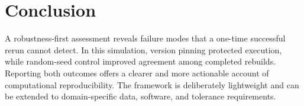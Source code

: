 \section{Conclusion}

A robustness-first assessment reveals failure modes that a one-time successful
rerun cannot detect. In this simulation, version pinning protected execution,
while random-seed control improved agreement among completed rebuilds. Reporting
both outcomes offers a clearer and more actionable account of computational
reproducibility. The framework is deliberately lightweight and can be extended
to domain-specific data, software, and tolerance requirements.
